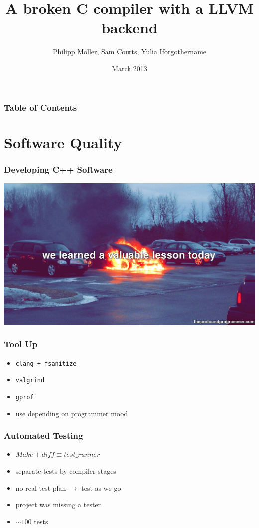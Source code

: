 \documentclass{beamer}
\title[c4]{A broken C compiler with a LLVM backend}
\author{Philipp Möller, Sam Courts, Yulia Iforgothername}
\date{March 2013}
\begin{document}
\frame{\titlepage}

\begin{frame}
  \frametitle{Table of Contents}
  \tableofcontents
\end{frame}

\section{Software Quality}

\begin{frame}
  \frametitle{Developing C++ Software}
  \includegraphics[scale=0.1]{valuable_lesson}
\end{frame}

\begin{frame}
  \frametitle{Tool Up}
  \begin{itemize}
  \item \tt{clang} + \tt{fsanitize}
  \item \tt{valgrind}
  \item \tt{gprof}
  \item use depending on programmer mood
  \end{itemize}
\end{frame}

\begin{frame}
  \frametitle{Automated Testing}
  \begin{itemize}
  \item $ \mathit{Make} + \mathit{diff} \equiv \mathit{test\_runner} $
  \item separate tests by compiler stages
  \item no real test plan $\rightarrow$ test as we go
  \item project was missing a tester
  \item $\sim{}100$ tests
  \end{itemize}
\end{frame}
\end{document}
